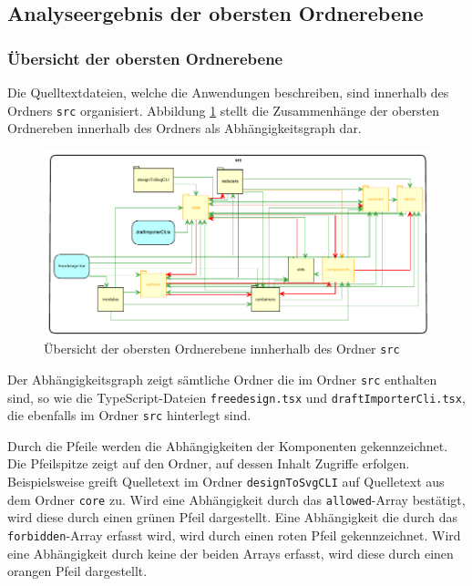 \subsection{Analyseergebnis der obersten Ordnerebene}
\subsubsection{Übersicht der obersten Ordnerebene}
\label{sec:overview}
Die Quelltextdateien, welche die Anwendungen beschreiben, sind innerhalb des Ordners \lstinline|src| organisiert. 
Abbildung \ref{fig:obersteOrdnerebene} stellt die Zusammenhänge der obersten Ordnereben innerhalb des Ordners als Abhängigkeitsgraph dar. 
\begin{figure}[H]
	\centering
    \caption{Übersicht der obersten Ordnerebene innherhalb des Ordner \lstinline|src|}
	\label{fig:obersteOrdnerebene}
	\includegraphics{diagrams/Ist-Architektur/Projektuebersicht.pdf}
\end{figure}


Der Abhängigkeitsgraph zeigt sämtliche Ordner die im Ordner \lstinline|src| enthalten sind, so wie die TypeScript-Dateien \lstinline|freedesign.tsx| und \lstinline|draftImporterCli.tsx|, die ebenfalls im Ordner \lstinline|src| hinterlegt sind.  

Durch die Pfeile werden die Abhängigkeiten der Komponenten gekennzeichnet. Die Pfeilspitze zeigt auf den Ordner, auf dessen Inhalt Zugriffe erfolgen. Beispielsweise greift Quelletext im Ordner \lstinline|designToSvgCLI| auf Quelletext aus dem Ordner \lstinline|core| zu.
Wird eine Abhängigkeit durch das \lstinline|allowed|-Array bestätigt, wird diese durch einen grünen Pfeil dargestellt. Eine Abhängigkeit die durch das \lstinline|forbidden|-Array erfasst wird, wird durch einen roten Pfeil gekennzeichnet. Wird eine Abhängigkeit durch keine der beiden Arrays erfasst, wird diese durch einen orangen Pfeil dargestellt.

